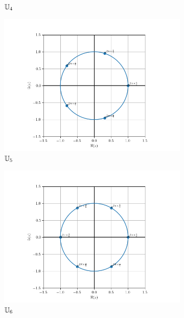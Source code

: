 \begin{figure}
\begin{subfigure}{.3\textwidth}
      \caption{$\mathbb{U}_4$}
      \label{fig:U4}      
    \end{subfigure}
    \begin{subfigure}{.3\textwidth}
      \centering
      \includegraphics[scale=.33]{U_5.png}  
      \caption{$\mathbb{U}_5$}
      \label{fig:U5}      
    \end{subfigure}
    \newline
    \begin{subfigure}{.3\textwidth}
      \centering
      \includegraphics[scale=.33]{U_6.png}  
      \caption{$\mathbb{U}_6$}
      \label{fig:U6}      
    \end{subfigure}
    \begin{subfigure}{.3\textwidth}

\end{subfigure}
\end{figure}
